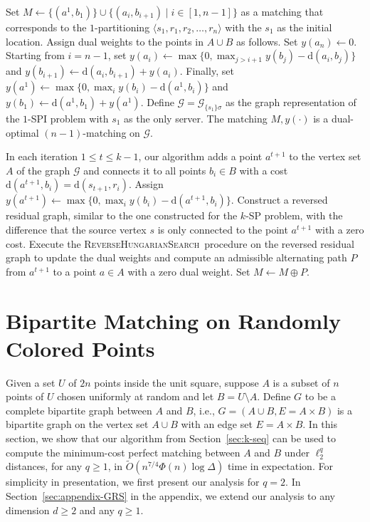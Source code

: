 \documentclass[11pt,onecolumn]{article}
\def\mcG{{\mathcal{G}}}
\newcommand{\distance}[2]{\mathrm{d}(#1, #2)}
\newcommand{\requests}{\sigma}
\newcommand{\reverse}{\textsc{ReverseHungarianSearch}}
\begin{document}
Set $M\leftarrow \{(a^1, b_1)\}\cup \{(a_i, b_{i+1})\mid i\in[1, n-1]\}$ as a matching that corresponds to the $1$-partitioning $\langle s_1, r_1, r_2,\ldots, r_n\rangle$ with the $s_1$ as the initial location. Assign dual weights to the points in $A\cup B$ as follows. Set $y(a_n)\leftarrow 0$. Starting from $i=n-1$, set $y(a_{i})\leftarrow\max\{0, \max_{j>i+1}y(b_j)-\distance{a_{i}}{b_j}\}$ and $y(b_{i+1})\leftarrow\distance{a_{i}}{b_{i+1}} + y(a_{i})$. Finally, set $y(a^{1})\leftarrow\max\{0, \max_{i}y(b_i)-\distance{a^{1}}{b_i}\}$ and $y(b_1)\leftarrow \distance{a^{1}}{b_{1}} + y(a^{1})$. Define $\mcG=\mcG_{\{s_1\}\requests}$ as the graph representation of the $1$-SPI problem with $s_1$ as the only server. The matching $M, y(\cdot)$ is a dual-optimal $(n-1)$-matching on $\mcG$.

In each iteration $1\le t\le k-1$, our algorithm adds a point $a^{t+1}$ to the vertex set $A$ of the graph $\mcG$ and connects it to all points $b_i\in B$ with a cost $\distance{a^{t+1}}{b_i} = \distance{s_{t+1}}{r_i}$. Assign $y(a^{t+1})\leftarrow\max\{0, \max_{i}y(b_i)-\distance{a^{t+1}}{b_i}\}$. Construct a reversed residual graph, similar to the one constructed for the $k$-SP problem, with the difference that the source vertex $s$ is only connected to the point $a^{t+1}$ with a zero cost. Execute the \reverse\ procedure on the reversed residual graph to update the dual weights and compute an admissible alternating path $P$ from $a^{t+1}$ to a point $a\in A$ with a zero dual weight. Set $M\leftarrow M\oplus P$.










\section{Bipartite Matching on Randomly Colored Points}\label{sec:randomly-colored}
Given a set $U$ of $2n$ points inside the unit square, suppose $A$ is a subset of $n$ points of $U$ chosen uniformly at random and let $B=U\setminus A$. Define $G$ to be a complete bipartite graph between $A$ and $B$, i.e., $G=(A\cup B, E=A\times B)$ is a bipartite graph on the vertex set $A\cup B$ with an edge set $E=A\times B$. In this section, we show that our algorithm from Section~\ref{sec:k-seq} can be used to compute the minimum-cost perfect matching between $A$ and $B$ under $\ell_2^q$ distances, for any $q\ge 1$, in $\tilde{O}(n^{7/4}\Phi(n)\log\Delta)$ time in expectation. For simplicity in presentation, we first present our analysis for $q=2$. In Section~\ref{sec:appendix-GRS} in the appendix, we extend our analysis to any dimension $d\ge 2$ and any $q\ge 1$. 
\end{document}
